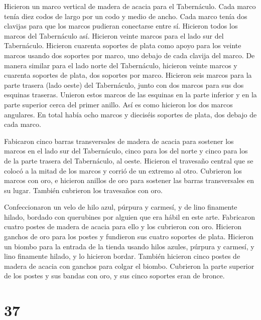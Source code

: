  Hicieron un marco vertical de madera de acacia para el
Tabernáculo.  Cada marco tenía diez codos de largo por un
codo y medio de ancho.  Cada marco tenía dos clavijas para
que los marcos pudieran conectarse entre sí. Hicieron todos los marcos
del Tabernáculo así.  Hicieron veinte marcos para el lado
sur del Tabernáculo.  Hicieron cuarenta soportes de plata
como apoyo para los veinte marcos usando dos soportes por marco, uno
debajo de cada clavija del marco.  De manera similar para
el lado norte del Tabernáculo, hicieron veinte marcos  y
cuarenta soportes de plata, dos soportes por marco. 
Hicieron seis marcos para la parte trasera (lado oeste) del Tabernáculo,
 junto con dos marcos para sus dos esquinas traseras.
 Unieron estos marcos de las esquinas en la parte inferior
y en la parte superior cerca del primer anillo. Así es como hicieron los
dos marcos angulares.  En total había ocho marcos y
dieciséis soportes de plata, dos debajo de cada marco.

 Fabicaron cinco barras transversales de madera de acacia
para sostener los marcos en el lado sur del Tabernáculo, 
cinco para los del norte y cinco para los de la parte trasera del
Tabernáculo, al oeste.  Hicieron el travesaño central que
se colocó a la mitad de los marcos y corrió de un extremo al otro.
 Cubrieron los marcos con oro, e hicieron anillos de oro
para sostener las barras transversales en su lugar. También cubrieron
los travesaños con oro.

 Confeccionaron un velo de hilo azul, púrpura y carmesí, y
de lino finamente hilado, bordado con querubines por alguien que era
hábil en este arte.  Fabricaron cuatro postes de madera de
acacia para ello y los cubrieron con oro. Hicieron ganchos de oro para
los postes y fundieron sus cuatro soportes de plata. 
Hicieron un biombo para la entrada de la tienda usando hilos azules,
púrpura y carmesí, y lino finamente hilado, y lo hicieron bordar.
 También hicieron cinco postes de madera de acacia con
ganchos para colgar el biombo. Cubrieron la parte superior de los postes
y sus bandas con oro, y sus cinco soportes eran de bronce.

\hypertarget{section-36}{%
\section{37}\label{section-36}}

